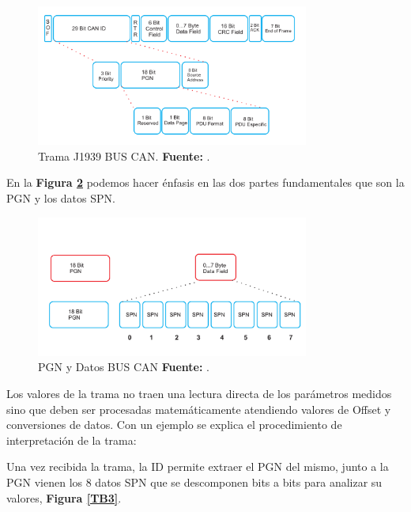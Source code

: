 \begin{figure}[H]
	\centering
	\includegraphics[width=0.8\textwidth]{./Cap5imagen/ID29.pdf}
	\caption[Trama J1939 BUS CAN.]{Trama J1939 BUS CAN.\textbf{ Fuente:} \cite{MCmi}.}
	\label{TB1} %
\end{figure}

En la \textbf{Figura \ref{TB2}} podemos hacer énfasis en las dos partes fundamentales que son la  PGN y los datos SPN.

\begin{figure}[H]
	\centering
	\includegraphics[width=0.8\textwidth]{./Cap5imagen/PGNDAT.pdf}
	\caption[PGN y Datos BUS CAN.]{PGN y Datos BUS CAN\textbf{ Fuente:} \cite{MCmi}.}
	\label{TB2} %
\end{figure}

Los valores de la trama no traen una lectura directa de los parámetros medidos sino que deben ser procesadas matemáticamente atendiendo valores de Offset y conversiones de datos.
Con un ejemplo se explica el procedimiento de interpretación de la trama:

Una vez recibida la trama, la ID permite extraer el PGN del mismo, junto a la PGN vienen los 8 datos SPN que se descomponen bits a bits para analizar su valores, \textbf{Figura \ref{TB3}}.

